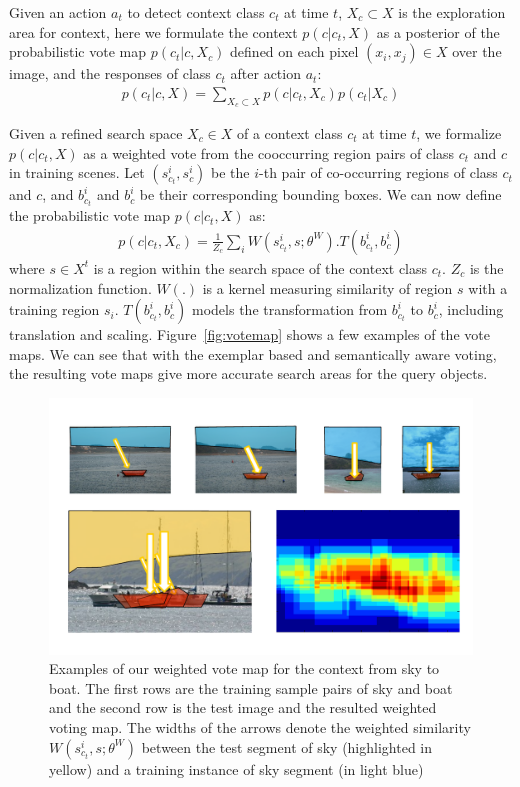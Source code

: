 Given an action $a_t$ to detect context class $c_t$ at time $t$, $X_c \subset X$ is the exploration area for context, here we formulate the context $p(c|c_t,X)$ as a posterior of the probabilistic vote map $p(c_t|c,X_c)$ defined on each pixel $(x_i,x_j)\in X$ over the image, and the responses of class $c_t$ after action $a_t$:
\begin{eqnarray}
p(c_t|c,X) = \sum_{X_c \subset X} p(c|c_t,X_c)p(c_t|X_c)
\end{eqnarray}

Given a refined search space $X_c\in X$ of a context class $c_t$ at time $t$, we formalize $p(c|c_t,X)$ as a weighted vote from the cooccurring region pairs of class $c_t$ and $c$ in training scenes. Let $(s_{c_t}^i, s_c^i)$ be the $i$-th pair of co-occurring regions of class $c_t$ and $c$, and $b_{c_t}^i$ and $b_c^i$ be their corresponding bounding boxes. We can now define the probabilistic vote map $p(c|c_t,X)$ as:
\begin{eqnarray}
\label{eq:votemap}
p(c|c_t,X_c) = \frac{1}{Z_c}\sum_i W(s_{c_t}^i,s;\theta^W).T(b_{c_t}^i,b_c^i)
\end{eqnarray}
where $s\in X^t$ is a region within the search space of the context class $c_t$. $Z_c$ is the normalization function. $W(.)$ is a kernel measuring similarity of region $s$ with a training region $s_i$. $T(b_{c_t}^i,b_c^i)$ models the transformation from $b_{c_t}^i$ to $b_c^i$, including translation and scaling. Figure~\ref{fig:votemap} shows a few examples of the vote maps. We can see that with the exemplar based and semantically aware voting, the resulting vote maps give more accurate search areas for the query objects.


\begin{figure}[ht!]
\begin{center}
\includegraphics[width=0.6\linewidth]{figures/vote_sky_boat.pdf}
\end{center}
\caption{Examples of our weighted vote map for the context from sky to boat. The first rows are the training sample pairs of sky and boat and the second row is the test image and the resulted weighted voting map. The widths of the arrows denote the weighted similarity $W(s_{c_t}^i,s;\theta^W)$ between the test segment of sky (highlighted in yellow) and a training instance of sky segment (in light blue)}
\label{fig:vote_sky_boat}
\end{figure}



